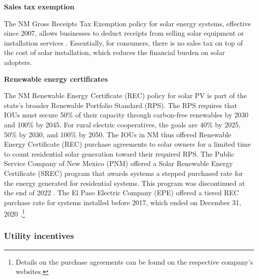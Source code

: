 \documentclass[12pt,twoside,letterpaper]{article}
\begin{document}
\noindent\textbf{Sales tax exemption}

The NM Gross Receipts Tax Exemption policy for solar energy systems, effective since 2007, allows businesses to deduct receipts from selling solar equipment or installation services \parencite{NMStat2021}. Essentially, for consumers, there is no sales tax on top of the cost of solar installation, which reduces the financial burden on solar adopters.


\noindent\textbf{Renewable energy certificates}

The NM Renewable Energy Certificate (REC) policy for solar PV is part of the state's broader Renewable Portfolio Standard (RPS). The RPS requires that IOUs must secure 50\% of their capacity through carbon-free renewables by 2030 and 100\% by 2045. For rural electric cooperatives, the goals are 40\% by 2025, 50\% by 2030, and 100\% by 2050. The IOUs in NM thus offered Renewable Energy Certificate (REC) purchase agreements to solar owners for a limited time to count residential solar generation toward their required RPS. The Public Service Company of New Mexico (PNM) offered a Solar Renewable Energy Certificate (SREC) program that awards systems a stepped purchased rate for the energy generated for residential systems. This program was discontinued at the end of 2022 \parencite{pnmrec}. The El Paso Electric Company (EPE) offered a tiered REC purchase rate for systems installed before 2017, which ended on December 31, 2020 \parencite{eperec, eperecmid}.\footnote{Details on the purchase agreements can be found on the respective company's websites.}

\subsubsection{Utility incentives}
\end{document}
